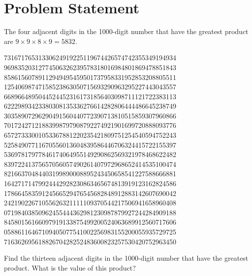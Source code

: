 \documentclass{article}
\begin{document}
\section*{Problem Statement}
The four adjacent digits in the 1000-digit number that have the greatest product are $9 \times 9 \times 8 \times 9 = 5832$.\\

\begin{center}
73167176531330624919225119674426574742355349194934\\
96983520312774506326239578318016984801869478851843\\
85861560789112949495459501737958331952853208805511\\
12540698747158523863050715693290963295227443043557\\
66896648950445244523161731856403098711121722383113\\
62229893423380308135336276614282806444486645238749\\
30358907296290491560440772390713810515859307960866\\
70172427121883998797908792274921901699720888093776\\
65727333001053367881220235421809751254540594752243\\
52584907711670556013604839586446706324415722155397\\
53697817977846174064955149290862569321978468622482\\
83972241375657056057490261407972968652414535100474\\
82166370484403199890008895243450658541227588666881\\
16427171479924442928230863465674813919123162824586\\
17866458359124566529476545682848912883142607690042\\
24219022671055626321111109370544217506941658960408\\
07198403850962455444362981230987879927244284909188\\
84580156166097919133875499200524063689912560717606\\
05886116467109405077541002256983155200055935729725\\
71636269561882670428252483600823257530420752963450
\end{center}


\noindent Find the thirteen adjacent digits in the 1000-digit number that have the greatest product. What is the value of this product?
\end{document}
